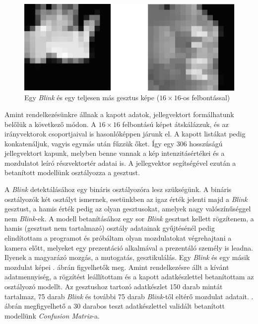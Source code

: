 \begin{figure}[h]
\centering
\includegraphics[scale=0.35]{images/blink-not_blink.png}
\caption{Egy \textit{Blink} és egy teljesen más gesztus képe ($16\times16$-os felbontással)}
\label{fig:blinkvsnotblink}
\end{figure}

Amint rendelkezésünkre állnak a kapott adatok, jellegvektort formálhatunk belőlük a következő módon. A $16\times16$ felbontású képet átskálázzuk, és az irányvektorok csoportjaival is hasonlóképpen járunk el. A kapott listákat pedig konkatenáljuk, vagyis egymás után fűzzük őket. Így egy 306 hosszúságú jellegvektort kapunk, melyben benne vannak a kép intenzitásértékei és a mozdulatot leíró részvektortér adatai is. A jellegvektor segítségével ezután a betanított modellünk osztályozza a gesztust.

A \textit{Blink} detektálásához egy bináris osztályozóra lesz szükségünk. A bináris osztályozók két osztályt ismernek, esetünkben az igaz érték jelenti majd a \textit{Blink} gesztust, a hamis érték pedig az olyan gesztusokat, amelyek nagy valószínűséggel nem \textit{Blink}-ek. A modell betanításához egy sor \textit{Blink} gesztust kellett rögzítenem, a hamis (gesztust nem tartalmazó) osztály adatainak gyűjtésénél pedig elindítottam a programot és próbáltam olyan mozdulatokat végrehajtani a kamera előtt, melyeket egy prezentáció alkalmával a prezentáló személy is leadna. Ilyenek a magyarázó mozgás, a mutogatás, gesztikulálás. Egy \textit{Blink} és egy másik mozdulat képei . ábrán figyelhetők meg. Amint rendelkezésre állt a kívánt adatmennyiség, a rögzítést leállítottam és a kapott adatkészlettel betanítottam az osztályozó modellt. Az gesztushoz tartozó adatkészlet 150 darab mintát tartalmaz, 75 darab \textit{Blink} és további 75 darab \textit{Blink}-től eltérő mozdulat adatait. . ábrán megfigyelhető a 30 darabos teszt adatkészlettel validált betanított modellünk \textit{Confusion Matrix}-a.

